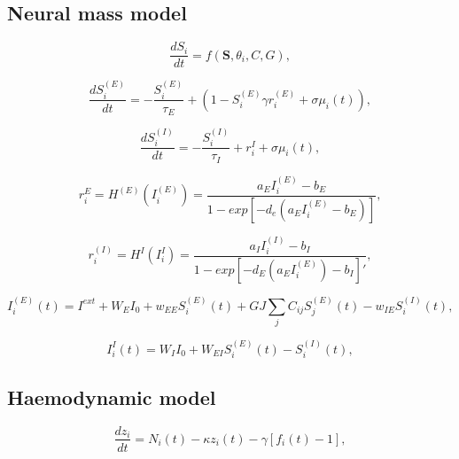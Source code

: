 \documentclass[sn-mathphys-num]{sn-jnl}%
\theoremstyle{thmstyleone}%
\theoremstyle{thmstyletwo}%
\theoremstyle{thmstylethree}%
\begin{document}
\subsection{Neural mass model} \label{sec:neural_mass} 


\begin{equation}\label{eq:temporal_activity}
	\frac{dS_i}{dt} = f(\boldsymbol{S}, \theta_i, C, G), 
\end{equation}


\begin{equation}\label{eq:synaptic_gating_E}
	\frac{dS_i^{(E)}}{dt} = - \frac{S_i^{(E)}}{\tau_E} + (1-S_i^{(E)} \gamma r_i^(E) + \sigma \mu_i(t)),
\end{equation}

\begin{equation}\label{eq:synaptic_gating_I}
	\frac{dS_i^{(I)}}{dt} = - \frac{S_i^{(I)}}{\tau_I} + r_i^{I} + \sigma \mu_i(t),
\end{equation}

\begin{equation}\label{eq:firing_rate_E}
	r_i^{E} = H^{(E)} (I_i^{(E)}) = \frac{a_E I_i^{(E)} - b_E}{1 - exp[-d_e (a_E I_i^{(E)} - b_E)]},
\end{equation}

\begin{equation}\label{eq:firing_rate_I}
	r_i^{(I)} = H^{I} (I_i^{I}) = \frac{a_I I_i^{(I)} - b_I}{1 - exp[-d_E (a_E I_i^{(E)}) - b_I]'},
\end{equation}

\begin{equation}\label{eq:input_current_E}
	I_i^{(E)}(t) = I^{ext} + W_E I_0 + w_{EE} S_i^{(E)} (t) + G J \sum_j C_{ij} S_j^{(E)}(t) - w_{IE} S_i^{(I)} (t), 
\end{equation}

\begin{equation}\label{eq:input_current_I}
	I_i^{I} (t) = W_I I_0 +
	W_{EI} S_i^{(E)} (t) - 
	S_i^{(I)} (t),
\end{equation}


\subsection{Haemodynamic model} \label{sec:haemodynamic_model}


\begin{equation}\label{eq:vasodilatory_signal}
	\frac{dz_i}{dt} = N_i (t) - 
	\kappa z_i(t) - 
	\gamma [f_i(t) - 1], 
\end{equation}
\end{document}
